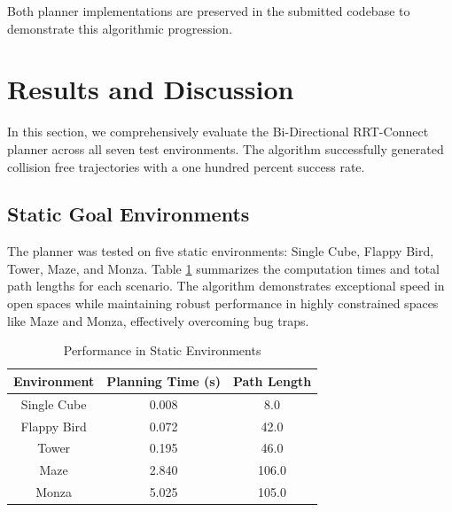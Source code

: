 \documentclass[letterpaper,journal]{IEEEtran}
\begin{document}
Both planner implementations are preserved in the submitted codebase to demonstrate this algorithmic progression.
\section{Results and Discussion}
In this section, we comprehensively evaluate the Bi-Directional RRT-Connect planner across all seven test environments. The algorithm successfully generated collision free trajectories with a one hundred percent success rate.

\subsection{Static Goal Environments}
The planner was tested on five static environments: Single Cube, Flappy Bird, Tower, Maze, and Monza. Table \ref{tab:static_results} summarizes the computation times and total path lengths for each scenario. The algorithm demonstrates exceptional speed in open spaces while maintaining robust performance in highly constrained spaces like Maze and Monza, effectively overcoming bug traps.

\begin{table}[htbp]
    \caption{Performance in Static Environments}
    \begin{center}
        \begin{tabular}{|c|c|c|}
            \hline
            \textbf{Environment} & \textbf{Planning Time (s)} & \textbf{Path Length} \\
            \hline
            Single Cube          & 0.008                      & 8.0                  \\
            \hline
            Flappy Bird          & 0.072                      & 42.0                 \\
            \hline
            Tower                & 0.195                      & 46.0                 \\
            \hline
            Maze                 & 2.840                      & 106.0                \\
            \hline
            Monza                & 5.025                      & 105.0                \\
            \hline
        \end{tabular}
        \label{tab:static_results}
    \end{center}
\end{table}
\end{document}
